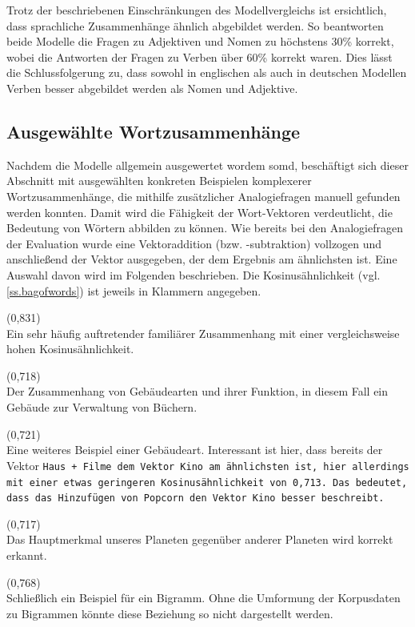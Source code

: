 Trotz der beschriebenen Einschränkungen des Modellvergleichs ist ersichtlich, dass sprachliche Zusammenhänge ähnlich abgebildet werden. So beantworten beide Modelle die Fragen zu Adjektiven und Nomen zu höchstens 30\% korrekt, wobei die Antworten der Fragen zu Verben über 60\% korrekt waren. Dies lässt die Schlussfolgerung zu, dass sowohl in englischen als auch in deutschen Modellen Verben besser abgebildet werden als Nomen und Adjektive.

\subsection{Ausgewählte Wortzusammenhänge}\label{ss.wortzusammenhaenge}
Nachdem die Modelle allgemein ausgewertet wordem somd, beschäftigt sich dieser Abschnitt mit ausgewählten konkreten Beispielen komplexerer Wortzusammenhänge, die mithilfe zusätzlicher Analogiefragen manuell gefunden werden konnten. Damit wird die Fähigkeit der Wort-Vektoren verdeutlicht, die Bedeutung von Wörtern abbilden zu können. Wie bereits bei den Analogiefragen der Evaluation wurde eine Vektoraddition (bzw. -subtraktion) vollzogen und anschließend der Vektor ausgegeben, der dem Ergebnis am ähnlichsten ist. Eine Auswahl davon wird im Folgenden beschrieben. Die Kosinusähnlichkeit (vgl. \autoref{ss.bagofwords}) ist jeweils in Klammern angegeben.

 (0,831)\\
Ein sehr häufig auftretender familiärer Zusammenhang mit einer vergleichsweise hohen Kosinusähnlichkeit.

 (0,718)\\
Der Zusammenhang von Gebäudearten und ihrer Funktion, in diesem Fall ein Gebäude zur Verwaltung von Büchern.

 (0,721)\\
Eine weiteres Beispiel einer Gebäudeart. Interessant ist hier, dass bereits der Vektor \tt{Haus + Filme} dem Vektor \tt{Kino} am ähnlichsten ist, hier allerdings mit einer etwas geringeren Kosinusähnlichkeit von 0,713. Das bedeutet, dass das Hinzufügen von \tt{Popcorn} den Vektor \tt{Kino} besser beschreibt.

 (0,717)\\
Das Hauptmerkmal unseres Planeten gegenüber anderer Planeten wird korrekt erkannt.

 (0,768)\\
Schließlich ein Beispiel für ein Bigramm. Ohne die Umformung der Korpusdaten zu Bigrammen könnte diese Beziehung so nicht dargestellt werden.

